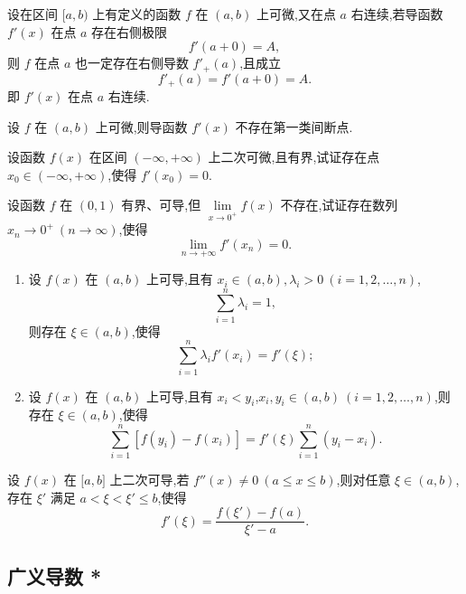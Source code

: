 \documentclass[../../数学分析培优讲义.tex]{subfiles}
\begin{document}
\begin{theorem}
设在区间 $\lbrack a,b)$ 上有定义的函数 $f$ 在 $(a,b)$ 上可微,又在点 $a$ 右连续,若导函数 $f'(x)$ 在点 $a$ 存在右侧极限
\[
    f'(a+0)=A,
\]
则 $f$ 在点 $a$ 也一定存在右侧导数 $f'_+(a)$,且成立
\[
    f'_+(a)=f'(a+0)=A.
\]
即 $f'(x)$ 在点 $a$ 右连续.
\end{theorem}

\begin{corollary}[\markstar]
设 $f$ 在 $(a,b)$ 上可微,则导函数 $f'(x)$ 不存在第一类间断点.
\end{corollary}

\begin{example}
设函数 $f(x)$ 在区间 $(-\infty,+\infty)$ 上二次可微,且有界,试证存在点 $x_0\in(-\infty,+\infty)$,使得 $f'(x_0)=0$.
\end{example}
\exampleblank

\begin{example}
设函数 $f$ 在 $(0,1)$ 有界、可导,但 $\displaystyle\lim\limits_{x\to0^+}f(x)$ 不存在,试证存在数列 $x_n\to0^+\ (n\to\infty)$,使得
\[
    \lim\limits_{n\to+\infty}f'(x_n)=0.
\]
\end{example}
\exampleblank

\begin{example}
\begin{enumerate}[label=(\arabic*)]
    \item 设 $f(x)$ 在 $(a,b)$ 上可导,且有 $x_i\in(a,b),\lambda_i>0\ (i=1,2,\ldots,n)$,
    \[
        \sum\limits_{i=1}^n\lambda_i=1,
    \]
    则存在 $\xi\in(a,b)$,使得
    \[
        \sum\limits_{i=1}^n\lambda_i f'(x_i)=f'(\xi);
    \]
    \item 设 $f(x)$ 在 $(a,b)$ 上可导,且有 $x_i<y_i$,$x_i,y_i\in(a,b)\ (i=1,2,\ldots,n)$,则存在 $\xi\in(a,b)$,使得
    \[
        \sum\limits_{i=1}^n[f(y_i)-f(x_i)]
        =f'(\xi)\sum\limits_{i=1}^n(y_i-x_i).
    \]
\end{enumerate}
\end{example}
\exampleblank

\begin{example}
设 $f(x)$ 在 $\lbrack a,b\rbrack$ 上二次可导,若 $f''(x)\neq0\ (a\leq x\leq b)$,则对任意 $\xi\in(a,b)$,存在 $\xi'$ 满足 $a<\xi<\xi'\leq b$,使得
\[
    f'(\xi)=\dfrac{f(\xi')-f(a)}{\xi'-a}.
\]
\end{example}
\exampleblank



\subsection{广义导数 *}
\end{document}
